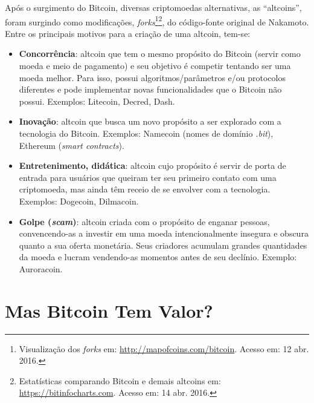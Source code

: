 Após o surgimento do Bitcoin, diversas criptomoedas alternativas, as ``altcoins'', foram surgindo como modificações, \textit{forks}\footnote{Visualização dos \textit{forks} em: \url{http://mapofcoins.com/bitcoin}. Acesso em: 12 abr. 2016.}\footnote{Estatísticas comparando Bitcoin e demais altcoins em: \url{https://bitinfocharts.com}. Acesso em: 14 abr. 2016.}, do código-fonte original de Nakamoto. Entre os principais motivos para a criação de uma altcoin, tem-se:
\begin{itemize}
	\item \textbf{Concorrência}: altcoin que tem o mesmo propósito do Bitcoin (servir como moeda e meio de pagamento) e seu objetivo é competir tentando ser uma moeda melhor. Para isso, possui algoritmos/parâmetros e/ou protocolos diferentes e pode implementar novas funcionalidades que o Bitcoin não possui. Exemplos: Litecoin, Decred, Dash.

	\item \textbf{Inovação}: altcoin que busca um novo propósito a ser explorado com a tecnologia do Bitcoin. Exemplos: Namecoin (nomes de domínio \textit{.bit}), Ethereum (\textit{smart contracts}).

	\item \textbf{Entretenimento, didática}: altcoin cujo propósito é servir de porta de entrada para usuários que queiram ter seu primeiro contato com uma criptomoeda, mas ainda têm receio de se envolver com a tecnologia. Exemplos: Dogecoin, Dilmacoin.

	\item \textbf{Golpe (\textit{scam})}: altcoin criada com o propósito de enganar pessoas, convencendo-as a investir em uma moeda intencionalmente insegura e obscura quanto a sua oferta monetária. Seus criadores acumulam grandes quantidades da moeda e lucram vendendo-as momentos antes de seu declínio. Exemplo: Auroracoin.
\end{itemize}

\section{Mas Bitcoin Tem Valor?}

